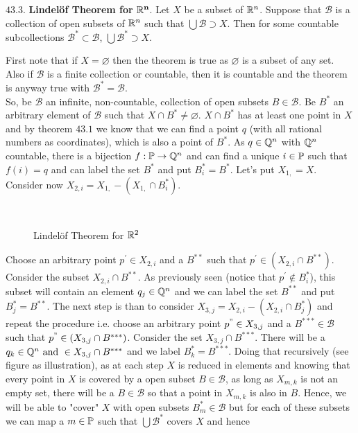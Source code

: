 \begin{tcolorbox}[colback=white]
$\mathbf{43.3.}$ \textbf{Lindelöf Theorem for }$\mathbf{\mathbb{R}^n}$. Let $X$ be a subset of $\mathbb{R}^n$. Suppose that $\mathscr{B} $ is a collection of open subsets of $\mathbb{R}^n$ such that $\bigcup \mathscr{B}\supset X$. Then for some countable subcollections $\mathscr{B}^{*}\subset \mathscr{B} $,  $\bigcup \mathscr{B}^{*}\supset X$.
\end{tcolorbox}
First note that if $X=\varnothing$ then the theorem is true as $\varnothing$ is a subset of any set.\\
Also if $\mathscr{B}$ is a finite collection or countable, then it is countable and the theorem is anyway true with $\mathscr{B}^{*}=\mathscr{B}$.\\
So, be $\mathscr{B}$ an infinite, non-countable, collection of open subsets $B\in \mathscr{B}$. Be $B^{*}$ an arbitrary element of $\mathscr{B}$ such that $X\cap B^{*}\neq \varnothing$. $X\cap B^{*}$ has at least one point in $X$ and by theorem $\mathbf{43.1}$ we know that we can find a point $q$ (with all rational numbers as coordinates), which is also a point of $B^{*}$. As $q\in \mathbb{Q}^n$ with $\mathbb{Q}^n$ countable, there is a bijection $f:\mathbb{P}\rightarrow \mathbb{Q}^n$  and can find a unique $i\in\mathbb{P}$ such that $f(i)=q$ and can label the set $B^{*}$ and put $B^{*}_i= B^{*}$. Let's put $X_{1,}=X$. Consider now $X_{2,i}= X_{1,}- ( X_{1,}\cap B^{*}_i)$. 
\begin{figure}[H]%
    \centering
\centering
    \subfloat[ ]{}
    \subfloat[$X_{2,i}= X_{1,}-(X_{1,}\cap B^{*}_i)$ ]{}\\
    \subfloat[$X_{3,j}= X_{2,i}-(X_{2,i}\cap B^{*}_j)$ ]{}
        \subfloat[$X_{4,k}= X_{3,j}-(X_{3,j}\cap B^{*}_k) $ ]{}
\caption{Lindelöf Theorem for $\mathbb{R}^2$}
\label{fig:fig_p8a}
\end{figure}
Choose an arbitrary point $p^{'}\in X_{2,i}$ and a $B^{**}$ such that $p^{'}\in (X_{2,i}\cap B^{**})$. Consider the subset $ X_{2,i}\cap B^{**}$. As previously seen (notice that $p^{'}\not \in B^{*}_i$), this subset will contain an element $q_j\in \mathbb{Q}^n$ and we can label the set $B^{**}$ and put $B^{*}_j= B^{**}$. The next step is than to consider $X_{3,j}= X_{2,i}-(X_{2,i}\cap B^{*}_j)$ and repeat the procedure i.e. choose an arbitrary point $p^{"}\in X_{3,j} $ and a $B^{***}\in\mathscr{B}$ such that $p^{"}\in (X_{3,j}\cap B^{***})$. Consider the set $X_{3,j}\cap B^{***}$. There will be a $q_k\in \mathbb{Q}^n \text{ and } \in X_{3,j}\cap B^{***}$ and we label $B^{*}_k= B^{***}$. Doing that recursively (see figure as illustration), as at each step $X$ is reduced in elements and knowing that every point in $X$ is covered by a open subset $B\in\mathscr{B}$, as long as $X_{m,k}$ is not an empty set, there will be a $B\in\mathscr{B}$ so that a point in $X_{m,k}$ is also in $B$. Hence, we will be able to "cover" $X$ with open subsets $B^{*}_m\in \mathscr{B}$ but for each of these subsets we can map a $m\in \mathbb{P}$ such that $\bigcup \mathscr{B^{*}}$ covers $X$ and hence
